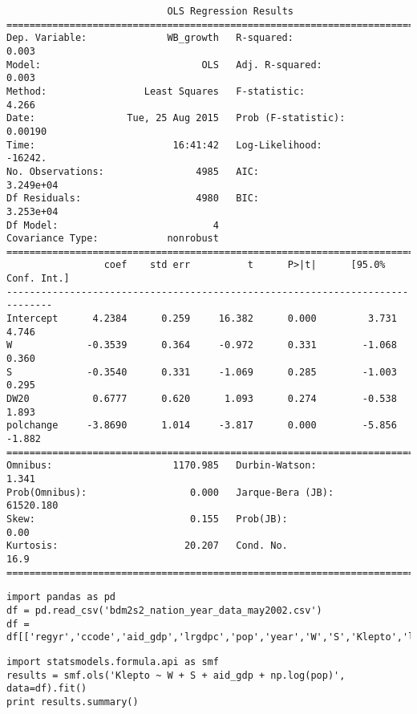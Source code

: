 \documentclass[12pt,fleqn]{article}\usepackage{common}
\begin{document}
\begin{verbatim}
                            OLS Regression Results                            
==============================================================================
Dep. Variable:              WB_growth   R-squared:                       0.003
Model:                            OLS   Adj. R-squared:                  0.003
Method:                 Least Squares   F-statistic:                     4.266
Date:                Tue, 25 Aug 2015   Prob (F-statistic):            0.00190
Time:                        16:41:42   Log-Likelihood:                -16242.
No. Observations:                4985   AIC:                         3.249e+04
Df Residuals:                    4980   BIC:                         3.253e+04
Df Model:                           4                                         
Covariance Type:            nonrobust                                         
==============================================================================
                 coef    std err          t      P>|t|      [95.0% Conf. Int.]
------------------------------------------------------------------------------
Intercept      4.2384      0.259     16.382      0.000         3.731     4.746
W             -0.3539      0.364     -0.972      0.331        -1.068     0.360
S             -0.3540      0.331     -1.069      0.285        -1.003     0.295
DW20           0.6777      0.620      1.093      0.274        -0.538     1.893
polchange     -3.8690      1.014     -3.817      0.000        -5.856    -1.882
==============================================================================
Omnibus:                     1170.985   Durbin-Watson:                   1.341
Prob(Omnibus):                  0.000   Jarque-Bera (JB):            61520.180
Skew:                           0.155   Prob(JB):                         0.00
Kurtosis:                      20.207   Cond. No.                         16.9
==============================================================================

\end{verbatim}


\begin{verbatim}
import pandas as pd
df = pd.read_csv('bdm2s2_nation_year_data_may2002.csv')
df = df[['regyr','ccode','aid_gdp','lrgdpc','pop','year','W','S','Klepto','laglrgdpc']]
\end{verbatim}

\begin{verbatim}
import statsmodels.formula.api as smf
results = smf.ols('Klepto ~ W + S + aid_gdp + np.log(pop)', data=df).fit()
print results.summary()
\end{verbatim}
\end{document}
